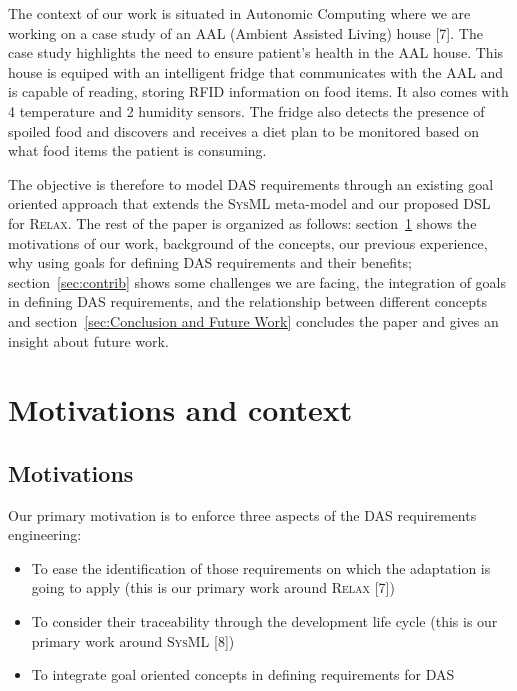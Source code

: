 \documentclass[10pt, conference, compsocconf]{IEEEtran}
\def\myrelax{\textsc{Relax}}                  %
\def\sysml{\textsc{SysML}}
\newcommand{\Mysec}[1]{section~\ref{sec:#1}}
\begin{document}
The context of our work is situated in Autonomic Computing where we are working on a case study of an AAL (Ambient Assisted Living) house [7]. The case study highlights the need to ensure patient's health in the AAL house. This house is equiped with an intelligent fridge that communicates with the AAL and is capable of reading, storing RFID information on food items. It also comes with 4 temperature and 2 humidity sensors. The fridge also detects the presence of spoiled food and discovers and receives a diet plan to be monitored based on what food items the patient is consuming. 

The objective is therefore to model DAS requirements through an existing goal oriented approach that extends the \sysml{} meta-model and our proposed DSL for \myrelax{}.
The rest of the paper is organized as follows: \Mysec{Our Previous Work} shows the motivations of our work, background of the concepts, our previous experience, why using goals for defining DAS requirements and their benefits; \Mysec{contrib} shows some challenges we are facing, the integration of goals in defining DAS requirements, and the relationship between different concepts and \Mysec{Conclusion and Future Work} concludes the paper and gives an insight about future work.

\section{Motivations and context}\label{sec:Our Previous Work}

\subsection{Motivations}

Our primary motivation is to enforce three aspects of the DAS requirements engineering:
\begin{itemize}
\item To ease the identification of those requirements on which the adaptation is going to apply (this is our primary work around \myrelax{} [7])
\item To consider their traceability through the development life cycle (this is our primary work around \sysml{} [8])
\item To integrate goal oriented  concepts in defining requirements for DAS
\end{itemize}
\end{document}
